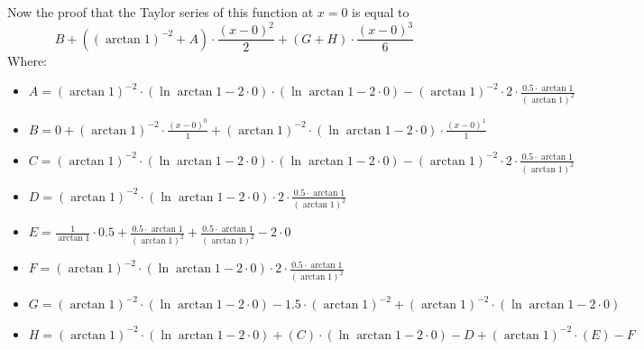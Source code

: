 \documentclass{article}
\begin{document}
Now the proof that the Taylor series of this function at $x = 0$ is equal to
\begin{equation}
B + \left( \left( \arctan 1 \right) ^{-2 } + A \right) \cdot \frac{\left( x - 0 \right) ^{2 } }{2 } + \left( G + H \right) \cdot \frac{\left( x - 0 \right) ^{3 } }{6 } 
\end{equation}
Where:
\begin{itemize}
	\item $A = \left( \arctan 1 \right) ^{-2 } \cdot \left( \ln \arctan 1 - 2 \cdot 0 \right) \cdot \left( \ln \arctan 1 - 2 \cdot 0 \right) - \left( \arctan 1 \right) ^{-2 } \cdot 2 \cdot \frac{0.5 \cdot \arctan 1 }{\left( \arctan 1 \right) ^{2 } } $
	\item $B = 0 + \left( \arctan 1 \right) ^{-2 } \cdot \frac{\left( x - 0 \right) ^{0 } }{1 } + \left( \arctan 1 \right) ^{-2 } \cdot \left( \ln \arctan 1 - 2 \cdot 0 \right) \cdot \frac{\left( x - 0 \right) ^{1 } }{1 } $
	\item $C = \left( \arctan 1 \right) ^{-2 } \cdot \left( \ln \arctan 1 - 2 \cdot 0 \right) \cdot \left( \ln \arctan 1 - 2 \cdot 0 \right) - \left( \arctan 1 \right) ^{-2 } \cdot 2 \cdot \frac{0.5 \cdot \arctan 1 }{\left( \arctan 1 \right) ^{2 } } $
	\item $D = \left( \arctan 1 \right) ^{-2 } \cdot \left( \ln \arctan 1 - 2 \cdot 0 \right) \cdot 2 \cdot \frac{0.5 \cdot \arctan 1 }{\left( \arctan 1 \right) ^{2 } } $
	\item $E = \frac{1 }{\arctan 1 } \cdot 0.5 + \frac{0.5 \cdot \arctan 1 }{\left( \arctan 1 \right) ^{2 } } + \frac{0.5 \cdot \arctan 1 }{\left( \arctan 1 \right) ^{2 } } - 2 \cdot 0 $
	\item $F = \left( \arctan 1 \right) ^{-2 } \cdot \left( \ln \arctan 1 - 2 \cdot 0 \right) \cdot 2 \cdot \frac{0.5 \cdot \arctan 1 }{\left( \arctan 1 \right) ^{2 } } $
	\item $G = \left( \arctan 1 \right) ^{-2 } \cdot \left( \ln \arctan 1 - 2 \cdot 0 \right) - 1.5 \cdot \left( \arctan 1 \right) ^{-2 } + \left( \arctan 1 \right) ^{-2 } \cdot \left( \ln \arctan 1 - 2 \cdot 0 \right) $
	\item $H = \left( \arctan 1 \right) ^{-2 } \cdot \left( \ln \arctan 1 - 2 \cdot 0 \right) + \left( C \right) \cdot \left( \ln \arctan 1 - 2 \cdot 0 \right) - D + \left( \arctan 1 \right) ^{-2 } \cdot \left( E \right) - F $
\end{itemize}
\end{document}
